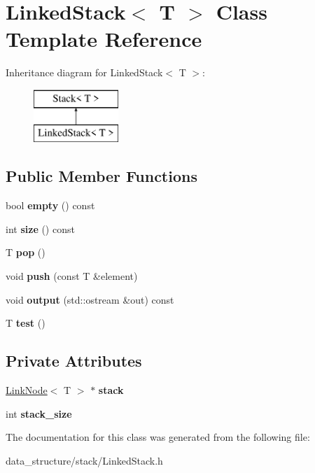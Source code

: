 \hypertarget{classLinkedStack}{}\section{Linked\+Stack$<$ T $>$ Class Template Reference}
\label{classLinkedStack}
Inheritance diagram for Linked\+Stack$<$ T $>$\+:\begin{figure}[H]
\begin{center}
\leavevmode
\includegraphics[height=2.000000cm]{classLinkedStack}
\end{center}
\end{figure}
\subsection*{Public Member Functions}
\begin{DoxyCompactItemize}
\item 
\mbox{\label{classLinkedStack_a472c529c6991d274634f1c37efc70f55}} 
bool {\bfseries empty} () const
\item 
\mbox{\label{classLinkedStack_a9c57e23fa333a6eb53a3874da556e555}} 
int {\bfseries size} () const
\item 
\mbox{\label{classLinkedStack_a6066a454b8361c80f5cd22513a321d8a}} 
T {\bfseries pop} ()
\item 
\mbox{\label{classLinkedStack_a1de73e6cfd7c850ef02b8198ffd2ae27}} 
void {\bfseries push} (const T \&element)
\item 
\mbox{\label{classLinkedStack_a62681222006253df75ad12f472d488b7}} 
void {\bfseries output} (std\+::ostream \&out) const
\item 
\mbox{\label{classLinkedStack_a8407e067813787b24d0570e57988805f}} 
T {\bfseries test} ()
\end{DoxyCompactItemize}
\subsection*{Private Attributes}
\begin{DoxyCompactItemize}
\item 
\mbox{\label{classLinkedStack_a76b5293e307b263fa9d0eddcb7b1c9fa}} 
\hyperlink{structLinkNode}{Link\+Node}$<$ T $>$ $\ast$ {\bfseries stack}
\item 
\mbox{\label{classLinkedStack_ae2b9dd4011e121427feb00b338d72697}} 
int {\bfseries stack\+\_\+size}
\end{DoxyCompactItemize}


The documentation for this class was generated from the following file\+:\begin{DoxyCompactItemize}
\item 
data\+\_\+structure/stack/Linked\+Stack.\+h\end{DoxyCompactItemize}
